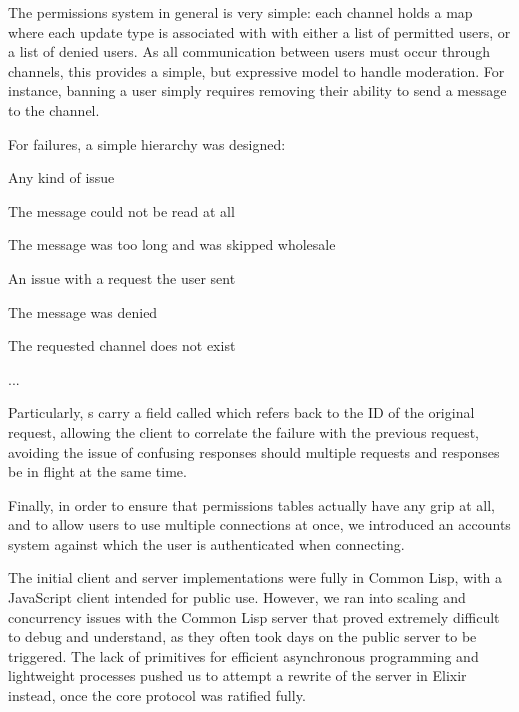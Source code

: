 \documentclass[format=sigconf]{acmart}
\begin{document}
The permissions system in general is very simple: each channel holds a map where each update type is associated with with either a list of permitted users, or a list of denied users. As all communication between users must occur through channels, this provides a simple, but expressive model to handle moderation. For instance, banning a user simply requires removing their ability to send a  message to the channel.

For failures, a simple hierarchy was designed:

\begin{step}
\item {} Any kind of issue
  \begin{step}
  \item {} The message could not be read at all
  \item {} The message was too long and was skipped wholesale
  \item {} An issue with a request the user sent
    \begin{step}
    \item {} The message was denied
    \item {} The requested channel does not exist
    \item ...
    \end{step}
  \end{step}
\end{step}

Particularly, s carry a field called  which refers back to the ID of the original request, allowing the client to correlate the failure with the previous request, avoiding the issue of confusing responses should multiple requests and responses be in flight at the same time.

Finally, in order to ensure that permissions tables actually have any grip at all, and to allow users to use multiple connections at once, we introduced an accounts system against which the user is authenticated when connecting.

The initial client and server implementations were fully in Common Lisp, with a JavaScript client intended for public use. However, we ran into scaling and concurrency issues with the Common Lisp server that proved extremely difficult to debug and understand, as they often took days on the public server to be triggered. The lack of primitives for efficient asynchronous programming and lightweight processes pushed us to attempt a rewrite of the server in Elixir instead, once the core protocol was ratified fully.
      
\end{document}
